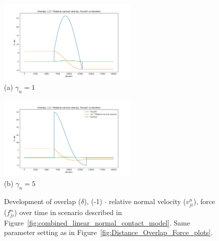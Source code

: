 \documentclass[11pt,
               a4paper,
               bibtotoc,
               idxtotoc,
               headsepline,
               footsepline,
               footexclude,
               BCOR12mm,
               DIV13,
               openany,   %
               ]
               {scrbook}
\begin{document}
\begin{figure}[H]
	\centering
	\begin{center}
		\includegraphics[width=0.6\textwidth]{figures/contactForceLaws/linearNormalContactModel/Overlap, Relative normal velocity vs Iteration simple_collision_two_particles_statistics_stiffness_50_viscosity_1e-2viscosity_1.png}
		\\ (a) $\gamma_n = 1$ %
	\end{center}
	
	\begin{center}
		\includegraphics[width=0.6\textwidth]{figures/contactForceLaws/linearNormalContactModel/Overlap, Relative normal velocity vs Iteration simple_collision_two_particles_statistics_stiffness_50_viscosity_1e-2viscosity_5.png}
		\\ (b) $\gamma_n = 5$
	\end{center}
	
	\caption[Combined Caption]{Development of overlap ($\delta$), (-1) $\cdot$ relative normal velocity ($v^n_{ji}$), force ($f^n_{ji}$) over time in scenario described in Figure~\ref{fig:combined_linear_normal_contact_model}.  Same parameter setting as in Figure~\ref{fig:Distance_Overlap_Force_plots}.}
	\label{fig:Relative_Normal_Velocity_plots}
\end{figure}
\end{document}
